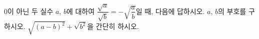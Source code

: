 0이 아닌 두 실수 $a$, $b$에 대하여 $\dfrac{\sqrt{a}}{\sqrt{b}}=-\sqrt{\dfrac{a}{b}}$일 때, 다음에 답하시오.
 $a$, $b$의 부호를 구하시오.
 $\sqrt{(a-b)^2}+\sqrt{b^2}$을 간단히 하시오.
